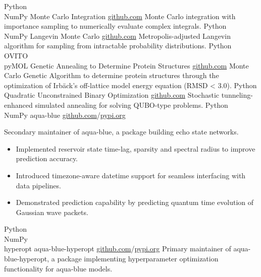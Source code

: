 \documentclass[9pt]{developercv} %
\begin{document}
\begin{entrylist}
	\entry
		{Python \\ NumPy}
		{Monte Carlo Integration}
		{\href{https://github.com/lonelyneutrin0/MNI}{github.com}}
		{Monte Carlo integration with importance sampling to numerically evaluate complex integrals.}
	\entry
		{Python \\ NumPy}
		{Langevin Monte Carlo}
		{\href{https://github.com/lonelyneutrin0/Metropolis-Langevin-Algorithm}{github.com}}
		{Metropolis-adjusted Langevin algorithm for sampling from intractable probability distributions.}
	\entry
		{Python \\ OVITO \\ pyMOL }
		{Genetic Annealing to Determine Protein Structures}
		{\href{https://github.com/lonelyneutrin0/Protein-Structure-Prediction}{github.com}}
		{Monte Carlo Genetic Algorithm to determine protein structures through the optimization of Irbäck's off-lattice model energy equation (RMSD < 3.0).}	
	\entry
		{Python}
		{Quadratic Unconstrained Binary Optimization}
		{\href{https://github.com/lonelyneutrin0/qubo}{github.com}}
		{Stochastic tunneling-enhanced simulated annealing for solving QUBO-type problems.}
	\entry
		{Python \\ NumPy}
		{aqua-blue}
		{\href{https://github.com/jwjeffr/aqua-blue}{github.com}/\href{https://pypi.org/project/aqua-blue/}{pypi.org}}
		{Secondary maintainer of aqua-blue, a package building echo state networks.
		\begin{itemize}[noitemsep,topsep=0pt,parsep=0pt,partopsep=0pt, leftmargin=7pt]
		\item Implemented reservoir state time-lag, sparsity and spectral radius to improve prediction accuracy.
		\item Introduced timezone-aware datetime support for seamless interfacing with data pipelines.
		\item Demonstrated prediction capability by predicting quantum time evolution of Gaussian wave packets. 
		\end{itemize}
		}
	\entry
		{Python \\ NumPy \\ hyperopt}
		{aqua-blue-hyperopt}
		{\href{https://github.com/lonelyneutrin0/aqua-blue-hyperopt}{github.com}/\href{https://pypi.org/project/aqua-blue-hyperopt/}{pypi.org}}
		{Primary maintainer of aqua-blue-hyperopt, a package implementing hyperparameter optimization functionality for aqua-blue models.
}
\end{entrylist}
\end{document}
